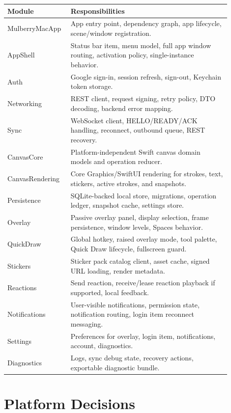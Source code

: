 \documentclass[11pt]{article}
\begin{document}
\begin{longtable}{p{0.22\linewidth} p{0.68\linewidth}}
\toprule
\textbf{Module} & \textbf{Responsibilities} \\
\midrule
MulberryMacApp & App entry point, dependency graph, app lifecycle, scene/window registration. \\
AppShell & Status bar item, menu model, full app window routing, activation policy, single-instance behavior. \\
Auth & Google sign-in, session refresh, sign-out, Keychain token storage. \\
Networking & REST client, request signing, retry policy, DTO decoding, backend error mapping. \\
Sync & WebSocket client, HELLO/READY/ACK handling, reconnect, outbound queue, REST recovery. \\
CanvasCore & Platform-independent Swift canvas domain models and operation reducer. \\
CanvasRendering & Core Graphics/SwiftUI rendering for strokes, text, stickers, active strokes, and snapshots. \\
Persistence & SQLite-backed local store, migrations, operation ledger, snapshot cache, settings store. \\
Overlay & Passive overlay panel, display selection, frame persistence, window levels, Spaces behavior. \\
QuickDraw & Global hotkey, raised overlay mode, tool palette, Quick Draw lifecycle, fullscreen guard. \\
Stickers & Sticker pack catalog client, asset cache, signed URL loading, render metadata. \\
Reactions & Send reaction, receive/lease reaction playback if supported, local feedback. \\
Notifications & User-visible notifications, permission state, notification routing, login item reconnect messaging. \\
Settings & Preferences for overlay, login item, notifications, account, diagnostics. \\
Diagnostics & Logs, sync debug state, recovery actions, exportable diagnostic bundle. \\
\bottomrule
\end{longtable}

\section{Platform Decisions}
\end{document}
